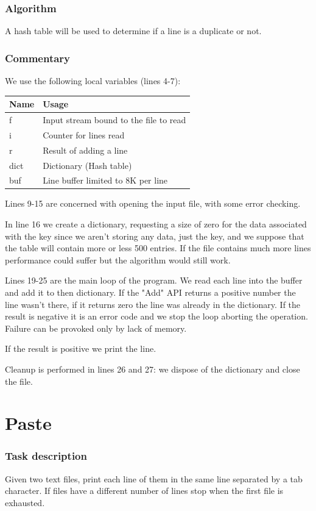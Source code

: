 \documentclass[12pt,a4paper,openany]{memoir} %
\begin{document}
{{\subsubsection{Algorithm}
A hash table will be used to determine if a line is a duplicate
or not.

\subsubsection{Commentary}
We use the following local variables (lines 4-7):
\par\noindent

\begin{tabular}{l|l}
Name   & Usage\\ \hline
f      & Input stream bound to the file to read\\
i      & Counter for lines read\\
r      & Result of adding a line\\
dict   & Dictionary (Hash table)\\
buf    & Line buffer limited to 8K per line\\
\end{tabular}
\par\noindent
Lines 9-15 are concerned with opening the input file, with some error
checking.

In line 16 we create a dictionary, requesting a size of zero for the
data associated with the key since we aren't storing any data, just the
key, and we suppose that the table will contain more or less 500
entries. If the file contains much more lines performance could
suffer but the algorithm would still work.

Lines 19-25 are the main loop of the program. We read each line into
the buffer and add it to then dictionary. If the "Add" API returns
a positive number the line wasn't there, if it returns zero the
line was already in the dictionary. If the result is negative it
is an error code and we stop the loop aborting the operation. Failure
can be provoked only by lack of memory.

If the result is positive we print the line.

Cleanup is performed in lines 26 and 27: we dispose of the dictionary
and close the file.

\section{Paste}
\subsubsection{Task description}
Given two text files, print each line of them in the same line separated by a tab character. If files have a different number of lines
stop when the first file is exhausted.

}}
\end{document}
